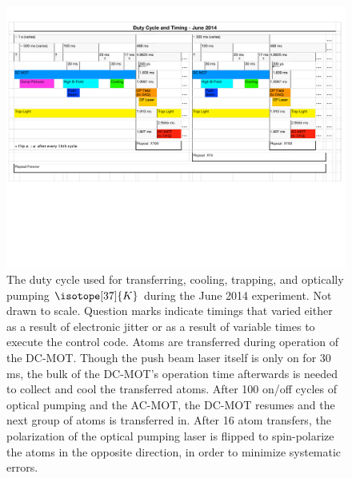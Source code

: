 \begin{figure}[h!!]
	\centering
	\includegraphics[width=.999\linewidth]
	{Figures/DutyCycle_2014.pdf}
	\caption[The 2014 duty cycle for transferring, cooling, trapping, and optically pumping $^{37}\textrm{K}$]{The duty cycle used for transferring, cooling, trapping, and optically pumping $\isotope[37]{K}$ during the June 2014 experiment.  Not drawn to scale.  Question marks indicate timings that varied either as a result of electronic jitter or as a result of variable times to execute the control code.  Atoms are transferred during operation of the DC-MOT.  Though the push beam laser itself is only on for $30\,$ms, the bulk of the DC-MOT's operation time afterwards is needed to collect and cool the transferred atoms.  After 100 on/off cycles of optical pumping and the AC-MOT, the DC-MOT resumes and the next group of atoms is transferred in.  After 16 atom transfers, the polarization of the optical pumping laser is flipped to spin-polarize the atoms in the opposite direction, in order to minimize systematic errors.  
	}	
	\label{fig:dutycycle}
\end{figure}
